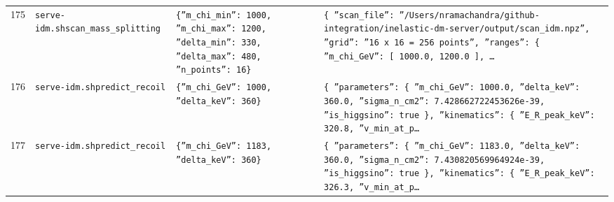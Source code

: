 \documentclass[11pt,a4paper]{article}
\begin{document}
\begin{longtable}{@{}p{}p{}p{}p{}@{}}
175 & \texttt{serve-idm.sh}\newline\texttt{scan\_\allowbreak{}mass\_\allowbreak{}splitting} & \texttt{\{''m\_\allowbreak{}chi\_\allowbreak{}min'':\allowbreak{} 1000,\allowbreak{} ''m\_\allowbreak{}chi\_\allowbreak{}max'':\allowbreak{} 1200,\allowbreak{} ''delta\_\allowbreak{}min'':\allowbreak{} 330,\allowbreak{} ''delta\_\allowbreak{}max'':\allowbreak{} 480,\allowbreak{} ''n\_\allowbreak{}points'':\allowbreak{} 16\}\allowbreak{}} & \texttt{\{   ''scan\_\allowbreak{}file'':\allowbreak{} ''/\allowbreak{}Users/\allowbreak{}nramachandra/\allowbreak{}github-integration/\allowbreak{}inelastic-dm-server/\allowbreak{}output/\allowbreak{}scan\_\allowbreak{}idm.npz'',\allowbreak{}   ''grid'':\allowbreak{} ''16 x 16 =\allowbreak{} 256 points'',\allowbreak{}   ''ranges'':\allowbreak{} \{     ''m\_\allowbreak{}chi\_\allowbreak{}GeV'':\allowbreak{} [       1000.0,\allowbreak{}       1200.0     ]\allowbreak{},\allowbreak{} \ldots{}\allowbreak{}} \\
176 & \texttt{serve-idm.sh}\newline\texttt{predict\_\allowbreak{}recoil} & \texttt{\{''m\_\allowbreak{}chi\_\allowbreak{}GeV'':\allowbreak{} 1000,\allowbreak{} ''delta\_\allowbreak{}keV'':\allowbreak{} 360\}\allowbreak{}} & \texttt{\{   ''parameters'':\allowbreak{} \{     ''m\_\allowbreak{}chi\_\allowbreak{}GeV'':\allowbreak{} 1000.0,\allowbreak{}     ''delta\_\allowbreak{}keV'':\allowbreak{} 360.0,\allowbreak{}     ''sigma\_\allowbreak{}n\_\allowbreak{}cm2'':\allowbreak{} 7.428662722453626e-39,\allowbreak{}     ''is\_\allowbreak{}higgsino'':\allowbreak{} true   \}\allowbreak{},\allowbreak{}   ''kinematics'':\allowbreak{} \{     ''E\_\allowbreak{}R\_\allowbreak{}peak\_\allowbreak{}keV'':\allowbreak{} 320.8,\allowbreak{}     ''v\_\allowbreak{}min\_\allowbreak{}at\_\allowbreak{}p\ldots{}\allowbreak{}} \\
177 & \texttt{serve-idm.sh}\newline\texttt{predict\_\allowbreak{}recoil} & \texttt{\{''m\_\allowbreak{}chi\_\allowbreak{}GeV'':\allowbreak{} 1183,\allowbreak{} ''delta\_\allowbreak{}keV'':\allowbreak{} 360\}\allowbreak{}} & \texttt{\{   ''parameters'':\allowbreak{} \{     ''m\_\allowbreak{}chi\_\allowbreak{}GeV'':\allowbreak{} 1183.0,\allowbreak{}     ''delta\_\allowbreak{}keV'':\allowbreak{} 360.0,\allowbreak{}     ''sigma\_\allowbreak{}n\_\allowbreak{}cm2'':\allowbreak{} 7.430820569964924e-39,\allowbreak{}     ''is\_\allowbreak{}higgsino'':\allowbreak{} true   \}\allowbreak{},\allowbreak{}   ''kinematics'':\allowbreak{} \{     ''E\_\allowbreak{}R\_\allowbreak{}peak\_\allowbreak{}keV'':\allowbreak{} 326.3,\allowbreak{}     ''v\_\allowbreak{}min\_\allowbreak{}at\_\allowbreak{}p\ldots{}\allowbreak{}} \\

\end{longtable}
\end{document}
